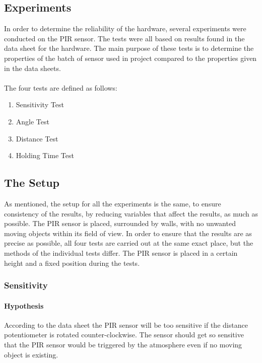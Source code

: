 \subsection{Experiments}
\label{sub:Experiments}
In order to determine the reliability of the hardware, several experiments were conducted on the PIR sensor. The tests were all based on results found in the data sheet for the hardware. The main purpose of these tests is to determine the properties of the batch of sensor used in project compared to the properties given in the data sheets\cite{datasheet_pir1}\cite{datasheet_pir2}.
\\\\
The four tests are defined as follows:

\begin{enumerate}
  \item Sensitivity Test
  \item Angle Test
  \item Distance Test
  \item Holding Time Test
\end{enumerate}

\subsection{The Setup}
\label{subs:The Setup}
As mentioned, the setup for all the experiments is the same, to ensure
consistency of the results, by reducing variables that affect the results, as
much as possible. The PIR sensor is placed, surrounded by walls, with no unwanted
moving objects within its field of view. In order to ensure that the results are
as precise as possible, all four tests are carried out at the same exact place,
but the methods of the individual tests differ. The PIR sensor is placed in a
certain height and a fixed position during the tests.

\subsubsection{Sensitivity}
\label{par:Sensitivity}

\paragraph{Hypothesis}
\label{subp:SenHypothesis}
According to the data sheet the PIR sensor will be too sensitive if the distance potentiometer is rotated counter-clockwise.
The sensor should get so sensitive that the PIR sensor would be triggered by the atmosphere even
if no moving object is existing\cite{datasheet_pir1}.
